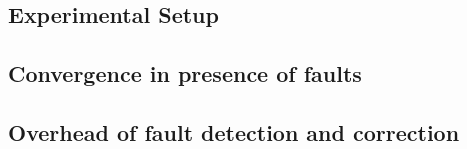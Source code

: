 \subsection{Experimental Setup}

\subsection{Convergence in presence of faults}

\subsection{Overhead of fault detection and correction}

